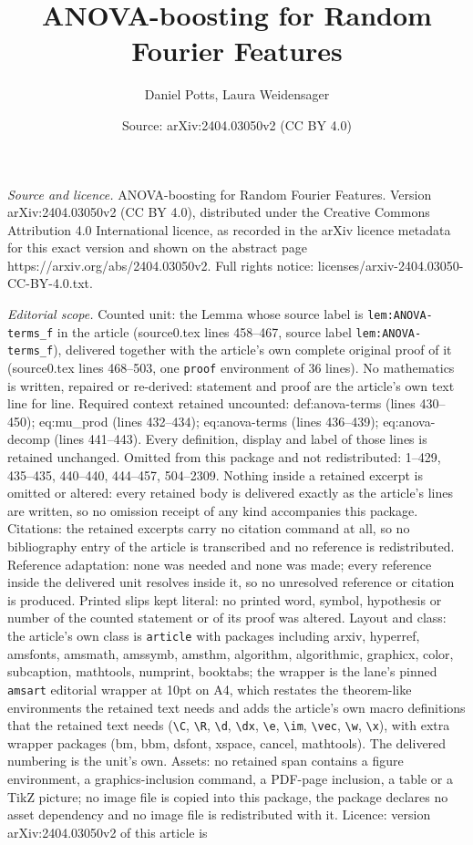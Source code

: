 \documentclass[10pt,a4paper]{amsart}
\title[ANOVA-boosting for Random Fourier Features]{ANOVA-boosting for Random Fourier Features}
\author{Daniel Potts, Laura Weidensager}
\date{Source: arXiv:2404.03050v2 (CC BY 4.0)}
\begin{document}
\maketitle

\noindent\emph{Source and licence.} ANOVA-boosting for Random Fourier Features. Version arXiv:2404.03050v2 (CC BY 4.0), distributed under the Creative Commons Attribution 4.0 International licence, as recorded in the arXiv licence metadata for this exact version and shown on the abstract page https://arxiv.org/abs/2404.03050v2. Full rights notice: licenses/arxiv-2404.03050-CC-BY-4.0.txt.\par\smallskip

\noindent\textit{Editorial scope.} Counted unit: the Lemma whose source label is \texttt{lem:ANOVA-terms\_f} in the article (source0.tex lines 458--467, source label \texttt{lem:ANOVA-terms\_f}), delivered together with the article's own complete original proof of it (source0.tex lines 468--503, one \texttt{proof} environment of 36 lines). No mathematics is written, repaired or re-derived: statement and proof are the article's own text line for line. Required context retained uncounted: def:anova-terms (lines 430--450); eq:mu\_prod (lines 432--434); eq:anova-terms (lines 436--439); eq:anova-decomp (lines 441--443). Every definition, display and label of those lines is retained unchanged. Omitted from this package and not redistributed: 1--429, 435--435, 440--440, 444--457, 504--2309. Nothing inside a retained excerpt is omitted or altered: every retained body is delivered exactly as the article's lines are written, so no omission receipt of any kind accompanies this package. Citations: the retained excerpts carry no citation command at all, so no bibliography entry of the article is transcribed and no reference is redistributed. Reference adaptation: none was needed and none was made; every reference inside the delivered unit resolves inside it, so no unresolved reference or citation is produced. Printed slips kept literal: no printed word, symbol, hypothesis or number of the counted statement or of its proof was altered. Layout and class: the article's own class is \texttt{article} with packages including arxiv, hyperref, amsfonts, amsmath, amssymb, amsthm, algorithm, algorithmic, graphicx, color, subcaption, mathtools, numprint, booktabs; the wrapper is the lane's pinned \texttt{amsart} editorial wrapper at 10pt on A4, which restates the theorem-like environments the retained text needs and adds the article's own macro definitions that the retained text needs (\texttt{\textbackslash C}, \texttt{\textbackslash R}, \texttt{\textbackslash d}, \texttt{\textbackslash dx}, \texttt{\textbackslash e}, \texttt{\textbackslash im}, \texttt{\textbackslash vec}, \texttt{\textbackslash w}, \texttt{\textbackslash x}), with extra wrapper packages (bm, bbm, dsfont, xspace, cancel, mathtools). The delivered numbering is the unit's own. Assets: no retained span contains a figure environment, a graphics-inclusion command, a PDF-page inclusion, a table or a TikZ picture; no image file is copied into this package, the package declares no asset dependency and no image file is redistributed with it. Licence: version arXiv:2404.03050v2 of this article is 
\end{document}

